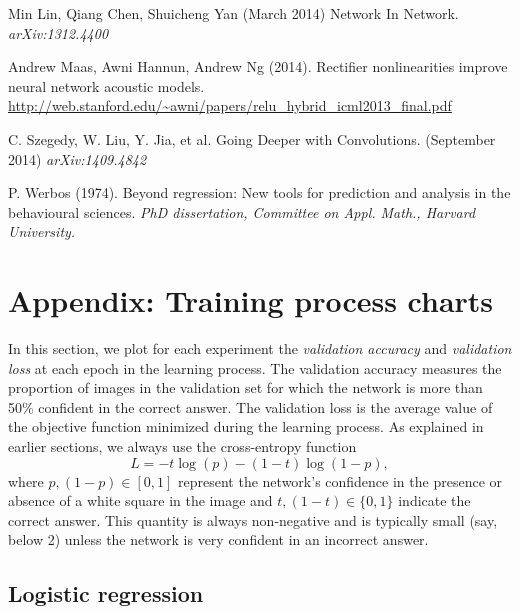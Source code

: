\documentclass{article}
\begin{document}
\begin{thebibliography}{10}
  Min Lin, Qiang Chen, Shuicheng Yan (March 2014)  Network In Network.  \textit{arXiv:1312.4400}

  Andrew Maas, Awni Hannun, Andrew Ng (2014). Rectifier nonlinearities improve neural network acoustic models. \url{http://web.stanford.edu/~awni/papers/relu_hybrid_icml2013_final.pdf}

  C. Szegedy, W. Liu, Y. Jia, et al. Going Deeper with Convolutions. (September 2014)
\textit{arXiv:1409.4842}

  P. Werbos (1974). Beyond regression: New tools for prediction and analysis in the behavioural sciences. \textit{PhD dissertation, Committee on Appl. Math., Harvard University.}

\end{thebibliography}


\clearpage
\section{Appendix: Training process charts}\label{charts}

  In this section, we plot for each experiment the \emph{validation accuracy} and \emph{validation loss} at each epoch in the learning process. The validation accuracy measures the proportion of images in the validation set for which the network is more than 50\% confident in the correct answer. The validation loss is the average value of the objective function minimized during the learning process. As explained in earlier sections, we always use the cross-entropy function
  \[ L = - t \log(p) - (1-t) \log(1-p), \]
  where $p, (1-p)\in [0, 1]$ represent the network's confidence in the presence or absence of a white square in the image and $t, (1-t)\in \{0,1\}$ indicate the correct answer. This quantity is always non-negative and is typically small (say, below 2) unless the network is very confident in an incorrect answer.


\subsection{Logistic regression}
\end{document}
